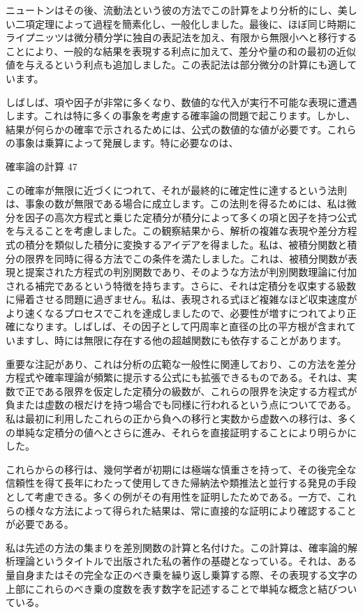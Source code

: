 \documentclass[a4paper,11pt,openany]{ltjsbook}
\begin{document}
ニュートンはその後、流動法という彼の方法でこの計算をより分析的にし、美しい二項定理によって過程を簡素化し、一般化しました。最後に、ほぼ同じ時期にライプニッツは微分積分学に独自の表記法を加え、有限から無限小へと移行することにより、一般的な結果を表現する利点に加えて、差分や量の和の最初の近似値を与えるという利点も追加しました。この表記法は部分微分の計算にも適しています。

しばしば、項や因子が非常に多くなり、数値的な代入が実行不可能な表現に遭遇します。これは特に多くの事象を考慮する確率論の問題で起こります。しかし、結果が何らかの確率で示されるためには、公式の数値的な値が必要です。これらの事象は乗算によって発展します。特に必要なのは、

確率論の計算 47

この確率が無限に近づくにつれて、それが最終的に確定性に達するという法則は、事象の数が無限である場合に成立します。この法則を得るためには、私は微分を因子の高次方程式と乗じた定積分が積分によって多くの項と因子を持つ公式を与えることを考慮しました。この観察結果から、解析の複雑な表現や差分方程式の積分を類似した積分に変換するアイデアを得ました。私は、被積分関数と積分の限界を同時に得る方法でこの条件を満たしました。これは、被積分関数が表現と提案された方程式の判別関数であり、そのような方法が判別関数理論に付加される補完であるという特徴を持ちます。さらに、それは定積分を収束する級数に帰着させる問題に過ぎません。私は、表現される式ほど複雑なほど収束速度がより速くなるプロセスでこれを達成しましたので、必要性が増すにつれてより正確になります。しばしば、その因子として円周率と直径の比の平方根が含まれていますし、時には無限に存在する他の超越関数にも依存することがあります。

重要な注記があり、これは分析の広範な一般性に関連しており、この方法を差分方程式や確率理論が頻繁に提示する公式にも拡張できるものである。それは、実数で正である限界を仮定した定積分の級数が、これらの限界を決定する方程式が負または虚数の根だけを持つ場合でも同様に行われるという点についてである。私は最初に利用したこれらの正から負への移行と実数から虚数への移行は、多くの単純な定積分の値へとさらに進み、それらを直接証明することにより明らかにした。

これらからの移行は、幾何学者が初期には極端な慎重さを持って、その後完全な信頼性を得て長年にわたって使用してきた帰納法や類推法と並行する発見の手段として考慮できる。多くの例がその有用性を証明したためである。一方で、これらの様々な方法によって得られた結果は、常に直接的な証明により確認することが必要である。

私は先述の方法の集まりを差別関数の計算と名付けた。この計算は、確率論的解析理論というタイトルで出版された私の著作の基礎となっている。それは、ある量自身またはその完全な正のべき乗を繰り返し乗算する際、その表現する文字の上部にこれらのべき乗の度数を表す数字を記述することで単純な概念と結びついている。
\end{document}
